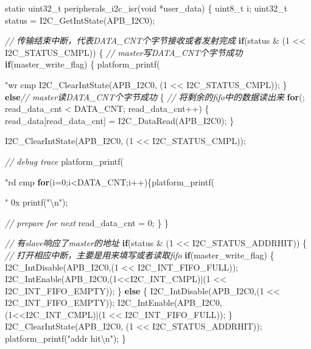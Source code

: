 \documentclass[
  12pt,
]{book}
\newenvironment{Shaded}{\begin{snugshade}}{\end{snugshade}}
\newcommand{\CommentTok}[1]{\textcolor[rgb]{0.56,0.35,0.01}{\textit{#1}}}
\newcommand{\ControlFlowTok}[1]{\textcolor[rgb]{0.13,0.29,0.53}{\textbf{#1}}}
\newcommand{\DataTypeTok}[1]{\textcolor[rgb]{0.13,0.29,0.53}{#1}}
\newcommand{\DecValTok}[1]{\textcolor[rgb]{0.00,0.00,0.81}{#1}}
\newcommand{\NormalTok}[1]{#1}
\newcommand{\SpecialCharTok}[1]{\textcolor[rgb]{0.00,0.00,0.00}{#1}}
\newcommand{\StringTok}[1]{\textcolor[rgb]{0.31,0.60,0.02}{#1}}
\begin{document}
\begin{Shaded}
\begin{Highlighting}[]
\DataTypeTok{static} \DataTypeTok{uint32_t}\NormalTok{ peripherals_i2c_isr(}\DataTypeTok{void}\NormalTok{ *user_data)}
\NormalTok{\{}
  \DataTypeTok{uint8_t}\NormalTok{ i;}
  \DataTypeTok{uint32_t}\NormalTok{ status = I2C_GetIntState(APB_I2C0);}
  
  \CommentTok{// 传输结束中断，代表DATA_CNT个字节接收或者发射完成}
  \ControlFlowTok{if}\NormalTok{(status & (}\DecValTok{1}\NormalTok{ << I2C_STATUS_CMPL))}
\NormalTok{  \{}
    \CommentTok{// master写DATA_CNT个字节成功}
    \ControlFlowTok{if}\NormalTok{(master_write_flag)}
\NormalTok{    \{}
\NormalTok{      platform_printf(}\StringTok{"wr cmp %
\NormalTok{      I2C_ClearIntState(APB_I2C0, (}\DecValTok{1}\NormalTok{ << I2C_STATUS_CMPL));}
\NormalTok{    \}}
    \ControlFlowTok{else}\CommentTok{// master读DATA_CNT个字节成功}
\NormalTok{    \{}
      \CommentTok{// 将剩余的fifo中的数据读出来}
      \ControlFlowTok{for}\NormalTok{(; read_data_cnt < DATA_CNT; read_data_cnt++)}
\NormalTok{      \{}
\NormalTok{        read_data[read_data_cnt] = I2C_DataRead(APB_I2C0);}
\NormalTok{      \}}

\NormalTok{      I2C_ClearIntState(APB_I2C0, (}\DecValTok{1}\NormalTok{ << I2C_STATUS_CMPL));}
      
      \CommentTok{// debug trace}
\NormalTok{      platform_printf(}\StringTok{"rd cmp %
      \ControlFlowTok{for}\NormalTok{(i=}\DecValTok{0}\NormalTok{;i<DATA_CNT;i++)\{platform_printf(}\StringTok{" 0x%
\NormalTok{      printf(}\StringTok{"}\SpecialCharTok{\textbackslash{}n}\StringTok{"}\NormalTok{);}
      
      \CommentTok{// prepare for next}
\NormalTok{      read_data_cnt = }\DecValTok{0}\NormalTok{;}
\NormalTok{    \}}
\NormalTok{  \}}
  
  \CommentTok{// 有slave响应了master的地址}
  \ControlFlowTok{if}\NormalTok{(status & (}\DecValTok{1}\NormalTok{ << I2C_STATUS_ADDRHIT))}
\NormalTok{  \{}
    \CommentTok{// 打开相应中断，主要是用来填写或者读取fifo}
    \ControlFlowTok{if}\NormalTok{(master_write_flag)}
\NormalTok{    \{}
\NormalTok{      I2C_IntDisable(APB_I2C0,(}\DecValTok{1}\NormalTok{ << I2C_INT_FIFO_FULL));}
\NormalTok{      I2C_IntEnable(APB_I2C0,(}\DecValTok{1}\NormalTok{<<I2C_INT_CMPL)|(}\DecValTok{1}\NormalTok{ << I2C_INT_FIFO_EMPTY));}
\NormalTok{    \}}
    \ControlFlowTok{else}
\NormalTok{    \{}
\NormalTok{      I2C_IntDisable(APB_I2C0,(}\DecValTok{1}\NormalTok{ << I2C_INT_FIFO_EMPTY));}
\NormalTok{      I2C_IntEnable(APB_I2C0,(}\DecValTok{1}\NormalTok{<<I2C_INT_CMPL)|(}\DecValTok{1}\NormalTok{ << I2C_INT_FIFO_FULL));}
\NormalTok{    \}}
\NormalTok{    I2C_ClearIntState(APB_I2C0, (}\DecValTok{1}\NormalTok{ << I2C_STATUS_ADDRHIT));}
\NormalTok{    platform_printf(}\StringTok{"addr hit}\SpecialCharTok{\textbackslash{}n}\StringTok{"}\NormalTok{);}
\NormalTok{  \}}
  
}}}
\end{Highlighting}
\end{Shaded}
\end{document}
